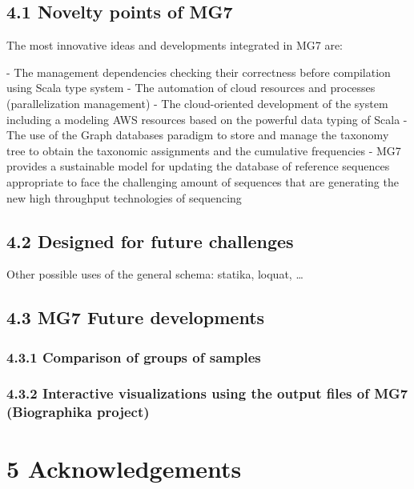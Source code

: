 \documentclass{frontiersSCNS} %
\begin{document}
\subsection{4.1 Novelty points of MG7}\label{novelty-points-of-mg7}

The most innovative ideas and developments integrated in MG7 are:

­- The management dependencies checking their correctness before
compilation using Scala type system - The automation of cloud resources
and processes (parallelization management) - The cloud-oriented
development of the system including a modeling AWS resources based on
the powerful data typing of Scala - The use of the Graph databases
paradigm to store and manage the taxonomy tree to obtain the taxonomic
assignments and the cumulative frequencies - MG7 provides a sustainable
model for updating the database of reference sequences appropriate to
face the challenging amount of sequences that are generating the new
high throughput technologies of sequencing

\subsection{4.2 Designed for future
challenges}\label{designed-for-future-challenges}

Other possible uses of the general schema: statika, loquat, \ldots{}

\subsection{4.3 MG7 Future developments}\label{mg7-future-developments}

\subsubsection{4.3.1 Comparison of groups of
samples}\label{comparison-of-groups-of-samples}

\subsubsection{4.3.2 Interactive visualizations using the output files
of MG7 (Biographika
project)}\label{interactive-visualizations-using-the-output-files-of-mg7-biographika-project}

\section{5 Acknowledgements}\label{acknowledgements}
\end{document}
